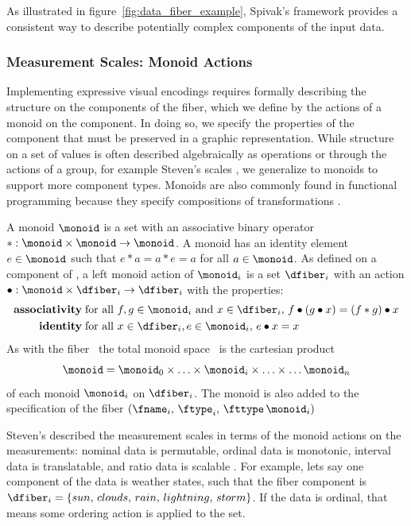 \documentclass[../main.tex]{subfiles}
\begin{document}
As illustrated in figure~\ref{fig:data_fiber_example}, Spivak's framework provides a consistent way to describe potentially complex components of the input data. 

\subsubsection{Measurement Scales: Monoid Actions}
\label{sec:data_monoid}
Implementing expressive visual encodings requires formally describing the structure on the components of the fiber, which we define by the actions of a monoid on the component. In doing so, we specify the properties of the component that must be preserved in a graphic representation. While structure on a set of values is often described algebraically as operations or through the actions of a group, for example Steven's scales \cite{stevensTheoryScalesMeasurement1946}, we generalize to monoids to support more component types. Monoids are also commonly found in functional programming because they specify compositions of transformations \cite{yorgeyMonoidsThemeVariations, stievenMonadJustMonoid2020}. 

A monoid \cite{Monoid2021} $\monoid$ is a set with an associative binary operator $\ast:\monoid \times \monoid\rightarrow \monoid$. A monoid has an identity element $e\in \monoid$ such that $e\ast a= a \ast e = a$ for all $a \in \monoid$. As defined on a component of \dfiber, a left monoid action \cite{SemigroupAction2021,nlab:action} of $\monoid_i$ is a set $\dfiber_i$ with an action $\bullet: \monoid\times \dfiber_i \rightarrow \dfiber_i$ with the properties:
\begin{align*}
    \textbf{associativity}\;& \text{for all } f,g \in \monoid_i \text{ and } x\in \dfiber_i,\, f\bullet(g\bullet x) = (f\ast g) \bullet x\\
    \textbf{identity}\;& \text{for all } x\in \dfiber_i, e\in \monoid_i,\,  e\bullet x = x 
\end{align*}
As with the fiber \dfiber\, the total monoid space \monoid\ is the cartesian product
\begin{equation}
\monoid= \monoid_{0} \times \ldots \times \monoid_{i}\times \ldots \times\ldots \monoid_{n}
\end{equation}
of each monoid $\monoid_{i}$ on $\dfiber_{i}$.  The monoid is also added to the specification of the fiber $(\fname_i,\, \ftype_i,\, \fttype\, \monoid_i)$

Steven's described the measurement scales\cite{stevensTheoryScalesMeasurement1946,leaFormalizationMeasurementScale} in terms of the monoid actions on the measurements: nominal data is permutable, ordinal data is monotonic, interval data is translatable, and ratio data is scalable \cite{weissteinSimilarityTransformation}. For example, lets say one component of the data is weather states, such that the fiber component is $\dfiber_i=\{sun,\, clouds,\, rain,\, lightning,\, storm\}$. If the data is ordinal, that means some ordering action is applied to the set.
\end{document}
